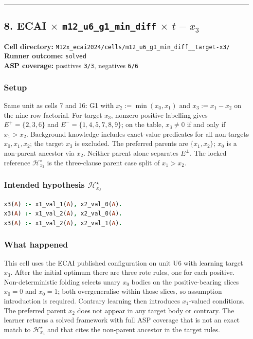 \documentclass[11pt]{article}
\begin{document}
\medskip\hrule\medskip

\subsection{\texorpdfstring{8. ECAI \(\times\) \texttt{m12\_u6\_g1\_min\_diff} \(\times\) \(t=x_3\)}{8. ECAI - m12-u6-g1-min-diff - target x3}}

\textbf{Cell directory:} \texttt{M12x\_ecai2024/cells/m12\_u6\_g1\_min\_diff\_\_target-x3/}\\
\textbf{Runner outcome:} \texttt{solved}\\
\textbf{ASP coverage:} positives \texttt{3/3}, negatives \texttt{6/6}

\subsubsection{Setup}

Same unit as cells 7 and 16: G1 with \(x_2:=\min(x_0,x_1)\) and \(x_3:=x_1-x_2\) on the nine-row factorial. For target \(x_3\), nonzero-positive labelling gives \(E^+=\{2,3,6\}\) and \(E^-=\{1,4,5,7,8,9\}\); on the table, \(x_3\neq 0\) if and only if \(x_1>x_2\). Background knowledge includes exact-value predicates for all non-targets \(x_0,x_1,x_2\); the target \(x_3\) is excluded. The preferred parents are \(\{x_1,x_2\}\); \(x_0\) is a non-parent ancestor via \(x_2\). Neither parent alone separates \(E^\pm\). The locked reference \(\mathcal{H}_{x_3}^\star\) is the three-clause parent case split of \(x_1>x_2\).

\subsubsection{\texorpdfstring{Intended hypothesis \(\mathcal{H}_{x_3}^\star\)}{Intended hypothesis H-star(x3)}}

\begin{lstlisting}[style=logic,language=Prolog]
x3(A) :- x1_val_1(A), x2_val_0(A).
x3(A) :- x1_val_2(A), x2_val_0(A).
x3(A) :- x1_val_2(A), x2_val_1(A).
\end{lstlisting}

\subsubsection{What happened}

This cell uses the ECAI published configuration on unit U6 with learning target \(x_3\). After the initial optimum there are three rote rules, one for each positive. Non-deterministic folding selects unary \(x_0\) bodies on the positive-bearing slices \(x_0=0\) and \(x_0=1\); both overgeneralise within those slices, so assumption introduction is required. Contrary learning then introduces \(x_1\)-valued conditions. The preferred parent \(x_2\) does not appear in any target body or contrary. The learner returns a solved framework with full ASP coverage that is not an exact match to \(\mathcal{H}_{x_3}^\star\) and that cites the non-parent ancestor in the target rules.
\end{document}
